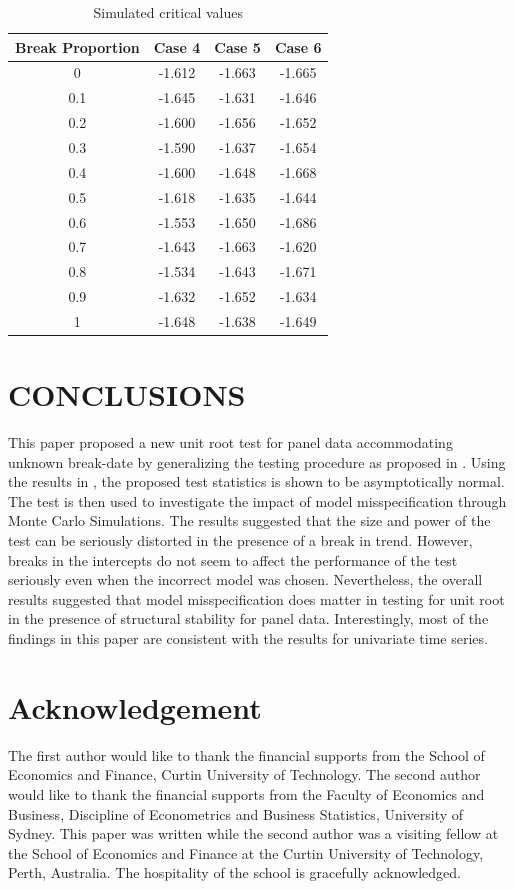 \documentclass[a4paper,fleqn]{article} %
\begin{document}
\begin{table} \label{table:cv}
\caption{Simulated critical values}
\begin{center}
\begin{tabular}{cccc}
\hline
Break Proportion&Case 4&Case 5&Case 6\\
\hline
0&-1.612&-1.663&-1.665\\
0.1&-1.645&-1.631&-1.646\\
0.2&-1.600&-1.656&-1.652\\
0.3&-1.590&-1.637&-1.654\\
0.4&-1.600&-1.648&-1.668\\
0.5&-1.618&-1.635&-1.644\\
0.6&-1.553&-1.650&-1.686\\
0.7&-1.643&-1.663&-1.620\\
0.8&-1.534&-1.643&-1.671\\
0.9&-1.632&-1.652&-1.634\\
1&-1.648&-1.638&-1.649\\
\hline
\end{tabular}
\end{center}
\end{table}%

\section{CONCLUSIONS}
This paper proposed a new unit root test for panel data accommodating unknown break-date by generalizing the testing procedure as proposed in \citet{KimPerron:2009}. Using the results in \citet{ChanManciniPauwels:2009}, the proposed test statistics is shown to be asymptotically normal. The test is then used to investigate the impact of model misspecification through Monte Carlo Simulations. The results suggested that the size and power of the test can be seriously distorted in the presence of a break in trend. However, breaks in the intercepts do not seem to affect the performance of the test seriously even when the incorrect model was chosen. Nevertheless, the overall results suggested that model misspecification does matter in testing for unit root in the presence of structural stability for panel data. Interestingly, most of the findings in this paper are consistent with the results for univariate time series.

\section*{Acknowledgement}
	The first author would like to thank the financial supports from the School of Economics and Finance, Curtin University of Technology. The second author would like to thank the financial supports from the Faculty of Economics and Business, Discipline of Econometrics and Business Statistics, University of Sydney. This paper was written while the second author was a visiting fellow at the School of Economics and Finance at the Curtin University of Technology, Perth, Australia. The hospitality of the school is gracefully acknowledged.


\end{document}
